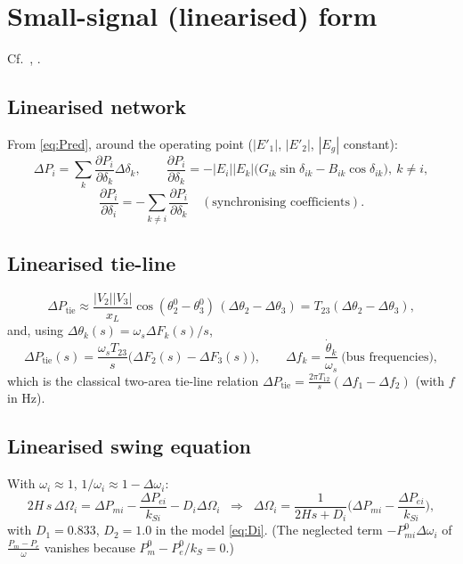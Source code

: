 \documentclass[11pt,a4paper]{article}
\numberwithin{equation}{section}
\begin{document}
\section{Small-signal (linearised) form}
%
\noindent Cf.\ \cite[Ch.~12]{Kundur1994}, \cite{SauerPai1998}.
\subsection{Linearised network}
From \eqref{eq:Pred}, around the operating point ($|E'_1|$, $|E'_2|$, $|E_g|$ constant):
\begin{equation}
\Delta P_i = \sum_k \frac{\partial P_i}{\partial\delta_k}\Delta\delta_k,\qquad
\frac{\partial P_i}{\partial\delta_k} = -|E_i||E_k|\big(G_{ik}\sin\delta_{ik} - B_{ik}\cos\delta_{ik}\big),\ k\neq i,
\end{equation}
\begin{equation}
\frac{\partial P_i}{\partial\delta_i} = -\sum_{k\neq i}\frac{\partial P_i}{\partial\delta_k}
\quad(\text{synchronising coefficients}).
\end{equation}
\subsection{Linearised tie-line}
\begin{equation}
\Delta P_{\text{tie}} \approx \frac{|V_2||V_3|}{x_L}\cos(\theta_2^0-\theta_3^0)\,(\Delta\theta_2-\Delta\theta_3) = T_{23}(\Delta\theta_2-\Delta\theta_3),
\end{equation}
and, using $\Delta\theta_k(s) = \omega_s\Delta F_k(s)/s$,
\begin{equation}
\Delta P_{\text{tie}}(s) = \frac{\omega_sT_{23}}{s}\big(\Delta F_{2}(s)-\Delta F_{3}(s)\big),\qquad \Delta f_k = \frac{\dot\theta_k}{\omega_s}\ \text{(bus frequencies)},
\end{equation}
which is the classical two-area tie-line relation $\Delta P_{\text{tie}} = \frac{2\pi T_{12}}{s}(\Delta f_1-\Delta f_2)$ (with $f$ in Hz).
\subsection{Linearised swing equation}
With $\omega_i\approx 1$, $1/\omega_i \approx 1-\Delta\omega_i$:
\begin{equation}
2H\,s\,\Delta\Omega_i = \Delta P_{mi} - \frac{\Delta P_{ei}}{k_{Si}} - D_i\Delta\Omega_i
\;\;\Longrightarrow\;\;
\Delta\Omega_i = \frac{1}{2Hs + D_i}\Big(\Delta P_{mi}-\frac{\Delta P_{ei}}{k_{Si}}\Big),
\end{equation}
with $D_1 = 0.833$, $D_2 = 1.0$ in the model \eqref{eq:Di}.
(The neglected term $-P_{mi}^0\Delta\omega_i$ of $\frac{P_m-P_e}{\omega}$ vanishes because $P_m^0 - P_e^0/k_S = 0$.)
\end{document}
